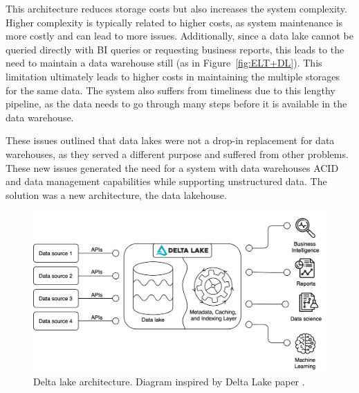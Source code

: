 This architecture reduces storage costs but also increases the system complexity. Higher complexity is typically related to higher costs, as system maintenance is more costly and can lead to more issues. Additionally, since a data lake cannot be queried directly with \gls{BI} queries or requesting business reports, this leads to the need to maintain a data warehouse still (as in Figure~\ref{fig:ELT+DL}). This limitation ultimately leads to higher costs in maintaining the multiple storages for the same data. The system also suffers from timeliness due to this lengthy pipeline, as the data needs to go through many steps before it is available in the data warehouse. 

These issues outlined that data lakes were not a drop-in replacement for data warehouses, as they served a different purpose and suffered from other problems. These new issues generated the need for a system with data warehouses \gls{ACID} and data management capabilities while supporting unstructured data. The solution was a new architecture, the data lakehouse. 

\begin{figure}[!ht]
    \begin{center}
      \includegraphics[width=\textwidth]{figures/2-background/DeltaLake_evolution-DeltaLake.png}
    \end{center}
    \caption[Delta lake architecture]{Delta lake architecture. Diagram inspired by Delta Lake paper \cite{armbrustDeltaLakeHighperformance2020}.}
    \label{fig:DeltaLake}
\end{figure}

